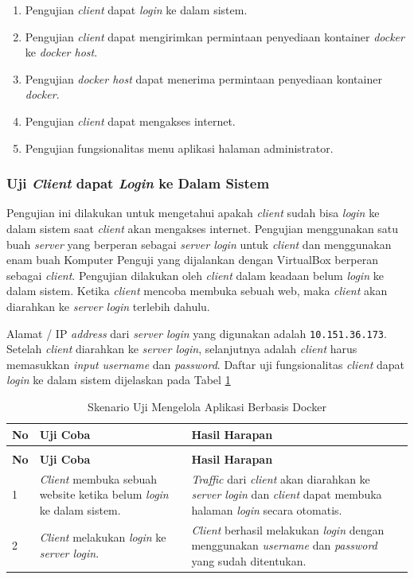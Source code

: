 \begin{enumerate}
\item Pengujian \textit{client} dapat \textit{login} ke dalam sistem.
\item Pengujian \textit{client} dapat mengirimkan permintaan penyediaan kontainer \textit{docker} ke \textit{docker host}.
\item Pengujian \textit{docker host} dapat menerima permintaan penyediaan kontainer \textit{docker}.
\item Pengujian \textit{client} dapat mengakses internet.
\item Pengujian fungsionalitas menu aplikasi halaman administrator.
\end{enumerate}

\subsubsection{Uji \textit{Client} dapat \textit{Login} ke Dalam Sistem}
Pengujian ini dilakukan untuk mengetahui apakah \textit{client} sudah bisa \textit{login} ke dalam sistem saat \textit{client} akan mengakses internet. Pengujian menggunakan satu buah \textit{server} yang berperan sebagai \textit{server login} untuk \textit{client} dan menggunakan enam buah Komputer Penguji yang dijalankan dengan VirtualBox berperan sebagai \textit{client}. Pengujian dilakukan oleh \textit{client} dalam keadaan belum \textit{login} ke dalam sistem. Ketika \textit{client} mencoba membuka sebuah web, maka \textit{client} akan diarahkan ke \textit{server login} terlebih dahulu.

Alamat / IP \textit{address} dari \textit{server login} yang digunakan adalah \texttt{10.151.36.173}. Setelah \textit{client} diarahkan ke \textit{server login}, selanjutnya adalah \textit{client} harus memasukkan \textit{input username} dan \textit{password}. Daftar uji fungsionalitas \textit{client} dapat \textit{login} ke dalam sistem dijelaskan pada Tabel \ref{ujicoba1}

\begin{longtable}{|p{}|p{}|p{}|}					\caption{Skenario Uji \textit{Client} dapat \textit{Login} ke Dalam Sistem} \label{ujicoba1} \\
	\hline
	\textbf{No} & \textbf{Uji Coba} & \textbf{Hasil Harapan} \\ \hline
	\endfirsthead
	\caption[]{Skenario Uji Mengelola Aplikasi Berbasis Docker} \\
	\hline
	\textbf{No} & \textbf{Uji Coba} & \textbf{Hasil Harapan} \\ \hline
	\endhead
	\endfoot
	\endlastfoot
	
	1 & \textit{Client} membuka sebuah website ketika belum \textit{login} ke dalam sistem. & \textit{Traffic} dari \textit{client} akan diarahkan ke \textit{server login} dan \textit{client} dapat membuka halaman \textit{login} secara otomatis.\\ \hline
	2 & \textit{Client} melakukan \textit{login} ke \textit{server login}. & \textit{Client} berhasil melakukan \textit{login} dengan menggunakan \textit{username} dan \textit{password} yang sudah ditentukan.\\ \hline
\end{longtable}

